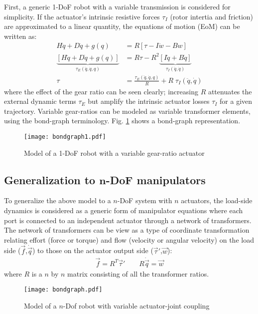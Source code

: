 First, a generic 1-DoF robot with a variable transmission is considered for simplicity. If the actuator's intrinsic resistive forces $\tau_I$ (rotor intertia and friction) are approximated to a linear quantity, the equations of motion (EoM) can be written as:
%
\begin{align}
  H \ddot{q} + D \dot{q} + g( q )	&= R  \left[ \tau - I \dot{w} - B w	\right] \\
	\underbrace{\left[	H \ddot{q} + D \dot{q} + g( q )	\right]}_{\tau_{E}(\ddot{q},\dot{q},q)}
	&= R \tau - R^2
	\underbrace{\left[ I \ddot{q} + B \dot{q}	\right]}_{\tau_{I}(\ddot{q},\dot{q})} \\
	\tau &= 	\frac{\tau_{E}(\ddot{q},\dot{q},q)}{R} + R \; \tau_{I}(\ddot{q},\dot{q})
	\label{eq:1dofEoM}
\end{align}
%
where the effect of the gear ratio can be seen clearly; increasing $R$ attenuates the external dynamic terms $\tau_{E}$ but amplify the intrinsic actuator losses $\tau_{I}$ for a given trajectory.
%
Variable gear-ratios can be modeled as variable transformer elements, using the bond-graph terminology. Fig. \ref{fig:bondgraph1} shows a bond-graph representation.
%
\begin{figure}[htp]
	\centering
		\texttt{[image: bondgraph1.pdf]}
	\caption{Model of a 1-DoF robot with a variable gear-ratio actuator}
	\label{fig:bondgraph1}
\end{figure}


\subsection{Generalization to $\boldsymbol{n}$-DoF manipulators}
\label{sec:GeneralizationToNDOFManipulators}

To generalize the above model to a $n$-DoF system with $n$ actuators, the load-side dynamics is considered as a generic form of manipulator equations where each port is connected to an independent actuator through a network of transformers. The network of transformers can be view as a type of coordinate transformation relating effort (force or torque) and flow (velocity or angular velocity) on the load side ($\vec{f}$,$\dot{\vec{q}}$) to those on the actuator output side ($\vec{\tau}'$,$\vec{w}$):
%
\begin{align}
	\vec{ f } = R^T \vec{\tau}' \quad  \quad R \dot{ \vec{q} } = \vec{w}
 \label{eq:coortransform}
\end{align}
%
where $R$ is a $n$ by $n$ matrix consisting of all the transformer ratios. 
%
\begin{figure}[htp]
	\centering
		\texttt{[image: bondgraph.pdf]}
	\caption{Model of a $n$-Dof robot with variable actuator-joint coupling}
	\label{fig:bondgraph}
\end{figure}

